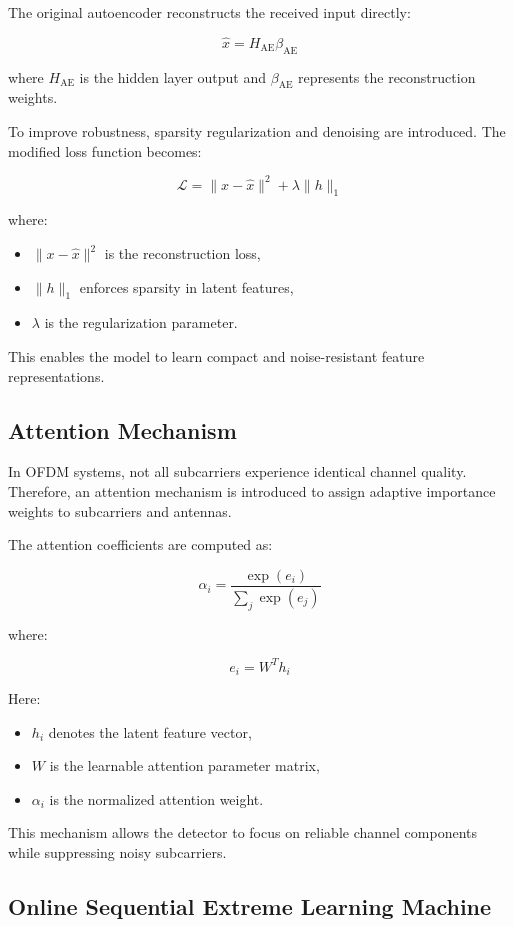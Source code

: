\documentclass[10pt, conference]{IEEEtran}
\begin{document}
The original autoencoder reconstructs the received input directly:

\[
\hat{x} = H_{\text{AE}}\beta_{\text{AE}}
\]

where $H_{\text{AE}}$ is the hidden layer output and $\beta_{\text{AE}}$ represents the reconstruction weights.

To improve robustness, sparsity regularization and denoising are introduced. The modified loss function becomes:

\[
\mathcal{L}
=
\|x - \hat{x}\|^2
+
\lambda \|h\|_1
\]

where:
\begin{itemize}
    \item $\|x - \hat{x}\|^2$ is the reconstruction loss,
    \item $\|h\|_1$ enforces sparsity in latent features,
    \item $\lambda$ is the regularization parameter.
\end{itemize}

This enables the model to learn compact and noise-resistant feature representations.

\subsection{Attention Mechanism}

In OFDM systems, not all subcarriers experience identical channel quality. Therefore, an attention mechanism is introduced to assign adaptive importance weights to subcarriers and antennas.

The attention coefficients are computed as:

\[
\alpha_i
=
\frac{
\exp(e_i)
}{
\sum_j \exp(e_j)
}
\]

where:

\[
e_i = W^T h_i
\]

Here:
\begin{itemize}
    \item $h_i$ denotes the latent feature vector,
    \item $W$ is the learnable attention parameter matrix,
    \item $\alpha_i$ is the normalized attention weight.
\end{itemize}

This mechanism allows the detector to focus on reliable channel components while suppressing noisy subcarriers.

\subsection{Online Sequential Extreme Learning Machine}
\end{document}
